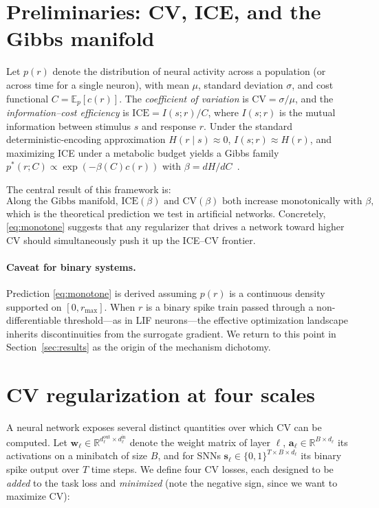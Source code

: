\documentclass{article}
\begin{document}
\section{Preliminaries: CV, ICE, and the Gibbs manifold}
\label{sec:prelim}

Let $p(r)$ denote the distribution of neural activity across a population (or across time for a single neuron), with mean $\mu$, standard deviation $\sigma$, and cost functional $C = \mathbb{E}_p[c(r)]$. The \emph{coefficient of variation} is $\mathrm{CV} = \sigma / \mu$, and the \emph{information--cost efficiency} is $\mathrm{ICE} = I(s;r)/C$, where $I(s;r)$ is the mutual information between stimulus $s$ and response $r$. Under the standard deterministic-encoding approximation $H(r\mid s) \approx 0$, $I(s;r) \approx H(r)$, and maximizing ICE under a metabolic budget yields a Gibbs family $p^*(r; C) \propto \exp(-\beta(C) c(r))$ with $\beta = dH/dC$~\cite{huang2025variability}.

The central result of this framework is:
\begin{equation}
\text{Along the Gibbs manifold, } \mathrm{ICE}(\beta) \text{ and } \mathrm{CV}(\beta) \text{ both increase monotonically with } \beta,
\tag{T1}
\label{eq:monotone}
\end{equation}
which is the theoretical prediction we test in artificial networks. Concretely, \eqref{eq:monotone} suggests that any regularizer that drives a network toward higher CV should simultaneously push it up the ICE--CV frontier.

\paragraph{Caveat for binary systems.} Prediction \eqref{eq:monotone} is derived assuming $p(r)$ is a continuous density supported on $[0, r_{\max}]$. When $r$ is a binary spike train passed through a non-differentiable threshold---as in LIF neurons---the effective optimization landscape inherits discontinuities from the surrogate gradient. We return to this point in Section~\ref{sec:results} as the origin of the mechanism dichotomy.

\section{CV regularization at four scales}
\label{sec:scales}

A neural network exposes several distinct quantities over which CV can be computed. Let $\mathbf{w}_\ell \in \mathbb{R}^{d_\ell^{\text{out}} \times d_\ell^{\text{in}}}$ denote the weight matrix of layer $\ell$, $\mathbf{a}_\ell \in \mathbb{R}^{B \times d_\ell}$ its activations on a minibatch of size $B$, and for SNNs $\mathbf{s}_\ell \in \{0,1\}^{T \times B \times d_\ell}$ its binary spike output over $T$ time steps. We define four CV losses, each designed to be \emph{added} to the task loss and \emph{minimized} (note the negative sign, since we want to maximize CV):
\end{document}
